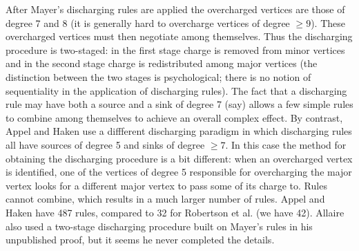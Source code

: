 \documentclass[11pt]{article}
\begin{document}
After Mayer's discharging rules are applied the overcharged vertices are those of degree 7 and 8 (it is generally hard to overcharge vertices of degree $\geq 9$). These overcharged vertices must then negotiate among themselves. Thus the discharging procedure is two-staged: in the first stage charge is removed from minor vertices and in the second stage charge is redistributed among major vertices (the distinction between the two stages is psychological; there is no notion of sequentiality in the application of discharging rules). The fact that a discharging rule may have both a source and a sink of degree 7 (say) allows a few simple rules to combine among themselves to achieve an overall complex effect. By contrast, Appel and Haken use a diffferent discharging paradigm in which discharging rules all have sources of degree 5 and sinks of degree $\geq 7$. In this case the method for obtaining the discharging procedure is a bit different: when an overcharged vertex is identified, one of the vertices of degree 5 responsible for overcharging the major vertex looks for a different major vertex to pass some of its charge to. Rules cannot combine, which results in a much larger number of rules. Appel and Haken have 487 rules, compared to 32 for Robertson et al. (we have 42). Allaire \cite{allaire} also used a two-stage discharging procedure built on Mayer's rules in his unpublished proof, but it seems he never completed the details.

\rsstrulesfig
\mainrulesfig
\end{document}
